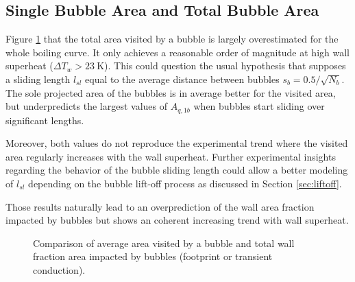 \subsection{Single Bubble Area and Total Bubble Area}

Figure \ref{fig:fullkoss_area} that the total area visited by a bubble is largely overestimated for the whole boiling curve. It only achieves a reasonable order of magnitude at high wall superheat ($\Delta T_{w} > 23\ $K). This could question the usual hypothesis that supposes a sliding length $l_{sl}$ equal to the average distance between bubbles $s_{b} = 0.5/\sqrt{N_{b}}$. The sole projected area of the bubbles is in average better for the visited area, but underpredicts the largest values of $A_{q,1b}$ when bubbles start sliding over significant lengths.

\npar

Moreover, both values do not reproduce the experimental trend where the visited area regularly increases with the wall superheat. Further experimental insights regarding the behavior of the bubble sliding length could allow a better modeling of $l_{sl}$ depending on the bubble lift-off process as discussed in Section \ref{sec:liftoff}.

\npar

Those results naturally lead to an overprediction of the wall area fraction impacted by bubbles but shows an coherent increasing trend with wall superheat.

\npar 



\begin{figure}[!h]
\caption{Comparison of average area visited by a bubble and total wall fraction area impacted by bubbles (footprint or transient conduction).}
\label{fig:fullkoss_area}
\end{figure}


